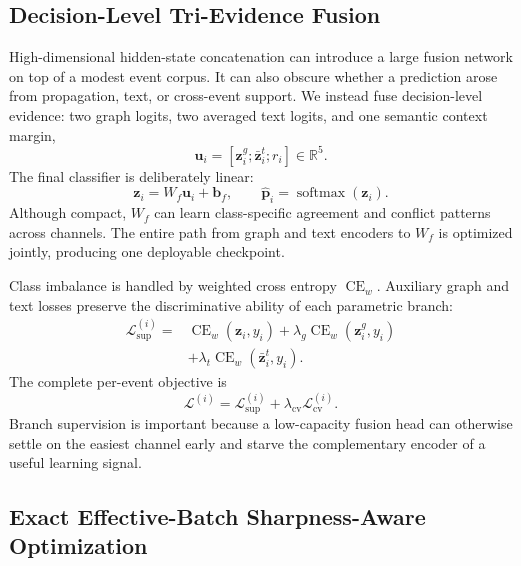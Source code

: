 \documentclass[sigconf,anonymous,review]{../acmart/acmart}
\newcommand{\softmax}{\operatorname{softmax}}
\begin{document}
\subsection{Decision-Level Tri-Evidence Fusion}
\label{sec:fusion}

High-dimensional hidden-state concatenation can introduce a large fusion
network on top of a modest event corpus.  It can also obscure whether a
prediction arose from propagation, text, or cross-event support.  We instead
fuse decision-level evidence: two graph logits, two averaged text
logits, and one semantic context margin,
\begin{equation}
  \boldsymbol{u}_i=
  [\boldsymbol{z}_i^g;\bar{\boldsymbol{z}}_i^t;r_i]
  \in\mathbb{R}^{5}.
  \label{eq:fusion-input}
\end{equation}
The final classifier is deliberately linear:
\begin{equation}
  \boldsymbol{z}_i=W_f\boldsymbol{u}_i+\boldsymbol{b}_f,\qquad
  \hat{\boldsymbol{p}}_i=\softmax(\boldsymbol{z}_i).
  \label{eq:fusion}
\end{equation}
Although compact, $W_f$ can learn class-specific agreement and conflict
patterns across channels.  The entire path from graph and text encoders to
$W_f$ is optimized jointly, producing one deployable checkpoint.

Class imbalance is handled by weighted cross entropy
$\operatorname{CE}_w$.  Auxiliary graph and text losses preserve the
discriminative ability of each parametric branch:
\begin{align}
  \mathcal{L}_{\mathrm{sup}}^{(i)}
  ={}&\operatorname{CE}_w(\boldsymbol{z}_i,y_i)
  +\lambda_g\operatorname{CE}_w(\boldsymbol{z}_i^g,y_i)\nonumber\\
  &+\lambda_t
  \operatorname{CE}_w(\bar{\boldsymbol{z}}_i^t,y_i).
  \label{eq:supervised-loss}
\end{align}
The complete per-event objective is
\begin{equation}
  \mathcal{L}^{(i)}
  =\mathcal{L}_{\mathrm{sup}}^{(i)}
  +\lambda_{\mathrm{cv}}\mathcal{L}_{\mathrm{cv}}^{(i)}.
  \label{eq:complete-loss}
\end{equation}
Branch supervision is important because a low-capacity fusion head can
otherwise settle on the easiest channel early and starve the complementary
encoder of a useful learning signal.

\subsection{Exact Effective-Batch Sharpness-Aware Optimization}
\label{sec:sam}
\end{document}
